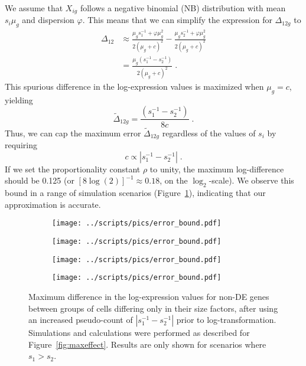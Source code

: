 \documentclass[10pt,letterpaper]{article}
\begin{document}
We assume that $X_{ig}$ follows a negative binomial (NB) distribution with mean $s_i\mu_g$ and dispersion $\varphi$.
This means that we can simplify the expression for $\Delta_{12g}$ to
\begin{align*}
\Delta_{12} 
&\approx \frac{\mu_g s_1^{-1} + \varphi \mu_g^2}{2(\mu_g + c)^2} - \frac{\mu_g s_2^{-1} + \varphi \mu_g^2}{2(\mu_g + c)^2} \\ 
&= \frac{\mu_g (s_1^{-1} - s_2^{-1})}{2(\mu_g + c)^2} \;.
\end{align*}
This spurious difference in the log-expression values is maximized when $\mu_g = c$, yielding 
\[
\tilde\Delta_{12g} = \frac{(s_1^{-1} - s_2^{-1})}{8c} \;.
\]
Thus, we can cap the maximum error $\tilde\Delta_{12g}$ regardless of the values of $s_i$ by requiring 
\[
    c \propto |s_1^{-1} - s_2^{-1}| \;.
\]
If we set the proportionality constant $\rho$ to unity, the maximum log-difference should be 0.125 (or $[8\log(2)]^{-1} \approx 0.18$, on the $\log_2$-scale).
We observe this bound in a range of simulation scenarios (Figure~\ref{fig:cappederr}), indicating that our approximation is accurate.

\begin{figure}[btp]
\centering
\begin{subfigure}[b]{0.49\textwidth}
    \texttt{[image: ../scripts/pics/error\_bound.pdf]}
    \caption{}
\end{subfigure}
\begin{subfigure}[b]{0.49\textwidth}
    \texttt{[image: ../scripts/pics/error\_bound.pdf]}
    \caption{}
\end{subfigure}
\begin{subfigure}[b]{0.49\textwidth}
    \texttt{[image: ../scripts/pics/error\_bound.pdf]}
    \caption{}
\end{subfigure}
\begin{subfigure}[b]{0.49\textwidth}
    \texttt{[image: ../scripts/pics/error\_bound.pdf]}
    \caption{}
\end{subfigure}
\caption{Maximum difference in the log-expression values for non-DE genes between groups of cells differing only in their size factors, 
after using an increased pseudo-count of $|s_1^{-1} - s_2^{-1}|$ prior to log-transformation.
Simulations and calculations were performed as described for Figure~\ref{fig:maxeffect}.
Results are only shown for scenarios where $s_1 > s_2$.
}
\label{fig:cappederr}
\end{figure}
\end{document}
